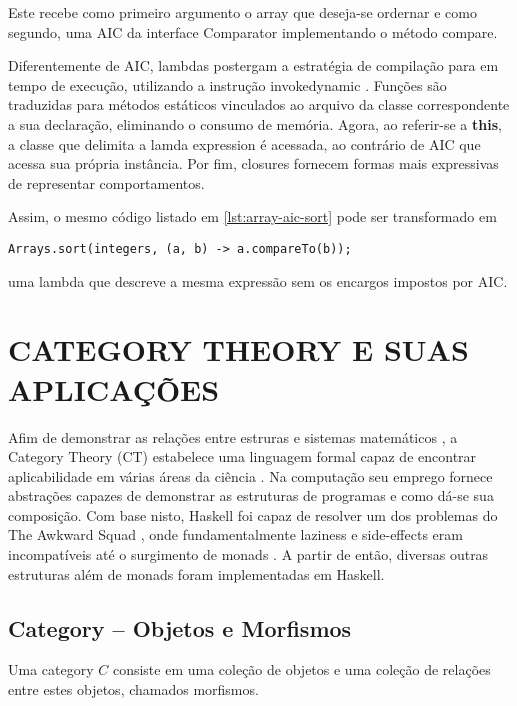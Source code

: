\documentclass[10pt, conference]{IEEEtran}
\begin{document}
Este recebe como primeiro argumento o array que deseja-se ordernar e como segundo, uma AIC da interface Comparator implementando o método compare.

Diferentemente de AIC, lambdas postergam a estratégia de compilação para em tempo de execução, utilizando a instrução invokedynamic \cite{goetz2012translation}. Funções são traduzidas para métodos estáticos vinculados ao arquivo da classe correspondente a sua declaração, eliminando o consumo de memória. Agora, ao referir-se a \textbf{this}, a classe que delimita a lamda expression é acessada, ao contrário de AIC que acessa sua própria instância. Por fim, closures fornecem formas mais expressivas de representar comportamentos.

Assim, o mesmo código listado em \ref{lst:array-aic-sort} pode ser transformado em

\begin{lstlisting}[caption={Lambda Expressions}]
Arrays.sort(integers, (a, b) -> a.compareTo(b));
\end{lstlisting}

uma lambda que descreve a mesma expressão sem os encargos impostos por AIC.

\section{CATEGORY THEORY E SUAS APLICAÇÕES}

Afim de demonstrar as relações entre estruras e sistemas matemáticos \cite{maclane1971mat}, a Category Theory (CT) estabelece uma linguagem formal capaz de encontrar aplicabilidade em várias áreas da ciência \cite{spivak2014cts}. Na computação seu emprego fornece abstrações capazes de demonstrar as estruturas de programas e como dá-se sua composição. Com base nisto, Haskell foi capaz de resolver um dos problemas do The Awkward Squad \cite{jones2001tacklingthe}, onde fundamentalmente laziness e side-effects eram incompatíveis até o surgimento de monads \cite{mogi1991monad}. A partir de então, diversas outras estruturas além de monads foram implementadas em Haskell.

\subsection{Category -- Objetos e Morfismos}

Uma category $C$ consiste em uma coleção de objetos e uma coleção de relações entre estes objetos, chamados morfismos.\\
\end{document}
